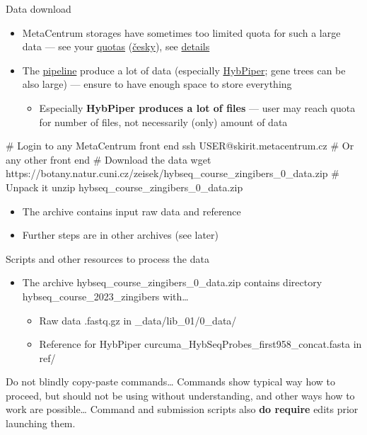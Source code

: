 \documentclass[compress, ucs, xelatex, 11pt, xcolor=x11names, aspectratio=169,
	hyperref={
		bookmarks=true,
		unicode=true,
		colorlinks=true,
		pdftitle={HybSeq course},
		plainpages=false,
		pdfauthor={Vojtech Zeisek},
		pdfsubject={Practical processing of HybSeq target enrichment sequencing data on computing grids like MetaCentrum},
		pdfcreator={XeLaTeX},
		pdfkeywords={BASH, command line, GNU, HybSeq, Linux, MetaCentrum, sequencing shell, target enrichment},
		linkcolor=Turquoise4, %
		anchorcolor=DodgerBlue4, %
		citecolor=DodgerBlue4, %
		filecolor=DodgerBlue4, %
		menucolor=Tan4, %
		urlcolor=DarkOliveGreen4, %
		pdftex},
	url={hyphens, lowtilde} %
	]{beamer}
\renewcommand{\texttt}[1]{\colorbox{Cornsilk2}{{\ttfamily #1}}}
\renewcommand{\alert}[1]{\textcolor{OrangeRed3}{#1}}
\begin{document}
\begin{frame}[fragile]{Data download}
	\label{datadownload}
	\begin{itemize}
		\item MetaCentrum storages have sometimes too limited quota for such a large data --- see your \href{https://metavo.metacentrum.cz/en/myaccount/kvoty}{quotas} (\href{http://metavo.metacentrum.cz/cs/myaccount/kvoty}{česky}), see \href{https://docs.metacentrum.cz/data/quotas/}{details}
		\item The \href{https://github.com/V-Z/hybseq-scripts}{pipeline} produce a lot of data (especially \href{https://github.com/mossmatters/HybPiper/}{HybPiper}; gene trees can be also large) --- ensure to have enough space to store everything
		\begin{itemize}
			\item Especially \textbf{HybPiper produces a lot of files} --- \alert{user may reach quota for number of files}, not necessarily (only) amount of data
		\end{itemize}
	\end{itemize}
	\begin{bashcode}
    # Login to any MetaCentrum front end
    ssh USER@skirit.metacentrum.cz # Or any other front end
    # Download the data
    wget https://botany.natur.cuni.cz/zeisek/hybseq_course_zingibers_0_data.zip
    # Unpack it
    unzip hybseq_course_zingibers_0_data.zip
	\end{bashcode}
	\begin{itemize}
		 \item The archive contains input raw data and reference
		 \item Further steps are in other archives (see later)
	\end{itemize}
\end{frame}

\begin{frame}{Scripts and other resources to process the data}
	\begin{itemize}
		\item The archive \texttt{hybseq\_course\_zingibers\_0\_data.zip} contains directory \texttt{hybseq\_course\_2023\_zingibers} with\ldots
		\begin{itemize}
			\item Raw data \texttt{*.fastq.gz} in \texttt{1\_data/lib\_01/0\_data/}
			\item Reference for HybPiper \texttt{curcuma\_HybSeqProbes\_first958\_concat.fasta} in \texttt{ref/}
		\end{itemize}
	\end{itemize}
	\begin{alertblock}{Do not blindly copy-paste commands\ldots}
		\alert{Commands show typical way how to proceed, but should not be using without understanding, and other ways how to work are possible\ldots}{ }Command and submission scripts also \textbf{do require} edits prior launching them.
	\end{alertblock}
\end{frame}
\end{document}
